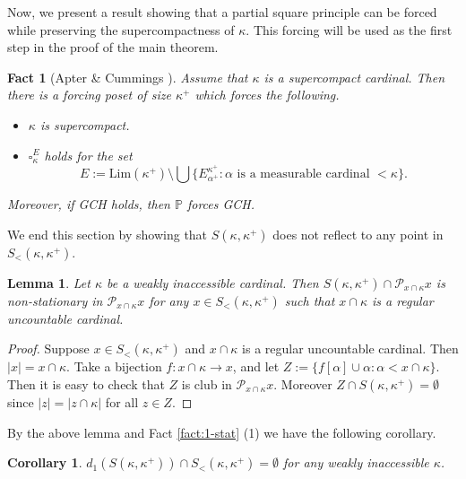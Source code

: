 \documentclass[a4paper,12pt,reqno,oneside]{amsart}
\theoremstyle{plain}
\newtheorem{lemma}[theorem]{Lemma}
\newtheorem{corollary}[theorem]{Corollary}
\newtheorem{fact}[theorem]{Fact}
\newcommand{\mbb}{\mathbb}
\newcommand{\mcal}{\mathcal}
\newcommand{\ltpt}{\mathrm{Lim}}
\begin{document}
Now, we present a result showing that a  partial square
principle can be forced while preserving the supercompactness of $\kappa$. This forcing will be used as the first step in the proof of the main theorem.


\begin{fact}[Apter \& Cummings \cite{AC}]\label{fact:Apter_Cummings}
Assume that $\kappa$ is a supercompact cardinal. Then there is a forcing poset of size $\kappa^+$ which forces the following.
\begin{itemize}
\item[(i)] $\kappa$ is supercompact.
\item[(ii)] $\square_\kappa^E$ holds for the set
\[
E := \ltpt ( \kappa^+ ) \setminus \bigcup \{ E^{\kappa^+}_{\alpha^+} : \mbox{$\alpha$ is a measurable cardinal $< \kappa$} \} .
\]
\end{itemize}
Moreover, if GCH holds, then $\mbb{P}$ forces GCH.
\end{fact}


We end this section by showing that $S( \kappa , \kappa^+ )$ does not reflect to any point in $S_< ( \kappa , \kappa^+ )$.


\begin{lemma} \label{lem:S_nonrefl_S<}
Let $\kappa$ be a weakly inaccessible cardinal. Then $S(\kappa, \kappa^{+})\cap \mcal{P}_{x \cap\kappa}{x}$ is non-stationary in $\mcal{P}_{x \cap\kappa} x$ for any $x \in S_{<}(\kappa, \kappa^{+})$ such that $x \cap \kappa$ is a regular uncountable cardinal.
\end{lemma}


\begin{proof}
Suppose $x \in S_< ( \kappa , \kappa^+ )$ and $x \cap \kappa$ is a regular uncountable cardinal. Then $|x| = x \cap \kappa$. Take a bijection $f : x \cap \kappa \to x$, and let $Z := \{ f[ \alpha ] \cup \alpha : \alpha < x \cap \kappa \}$. Then it is easy to check that $Z$ is club in $\mcal{P}_{x \cap \kappa} x$. Moreover $Z \cap S( \kappa , \kappa^+ ) = \emptyset$ since $|z| = | z \cap \kappa |$ for all $z \in Z$.
\end{proof}

By the above lemma and Fact \ref{fact:1-stat} (1) we have the following corollary.

\begin{corollary}\label{cor:dS_S<}
$d_1(S(\kappa, \kappa^{+})) \cap S_{<}(\kappa, \kappa^{+})= \emptyset$ for any weakly inaccessible $\kappa$.
\end{corollary}
\end{document}
